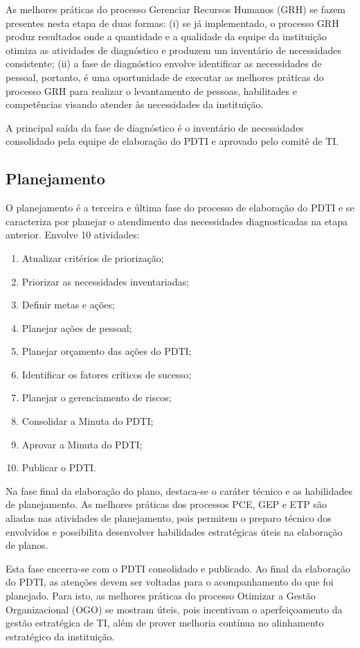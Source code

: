 As melhores práticas do processo Gerenciar Recursos Humanos (GRH) se fazem presentes nesta etapa de duas formas: (i) se já implementado, o processo GRH produz resultados onde a quantidade e a qualidade da equipe da instituição otimiza as atividades de diagnóstico e produzem um inventário de necessidades consistente; (ii) a fase de diagnóstico envolve identificar as necessidades de pessoal, portanto, é uma oportunidade de executar as melhores práticas do processo GRH para realizar o levantamento de pessoas, habilitades e competências visando atender às necessidades da instituição.

A principal saída da fase de diagnóstico é o inventário de necessidades consolidado pela equipe de elaboração do PDTI e aprovado pelo comitê de TI.


\subsection{Planejamento}

O planejamento é a terceira e última fase do processo de elaboração do PDTI e se caracteriza por planejar o atendimento das necessidades diagnosticadas na etapa anterior. Envolve 10 atividades:
\begin{enumerate}
\item Atualizar critérios de priorização;
\item Priorizar as necessidades inventariadas;
\item Definir metas e ações;
\item Planejar ações de pessoal;
\item Planejar orçamento das ações do PDTI;
\item Identificar os fatores críticos de sucesso;
\item Planejar o gerenciamento de riscos;
\item Consolidar a Minuta do PDTI;
\item Aprovar a Minuta do PDTI;
\item Publicar o PDTI.
\end{enumerate}

Na fase final da elaboração do plano, destaca-se o caráter técnico e as habilidades de planejamento. As melhores práticas dos processos PCE, GEP e ETP são aliadas nas atividades de planejamento, pois permitem o preparo técnico dos envolvidos e possibilita desenvolver habilidades estratégicas úteis na elaboração de planos.

Esta fase encerra-se com o PDTI consolidado e publicado. Ao final da elaboração do PDTI, as atenções devem ser voltadas para o acompanhamento do que foi planejado. Para isto, as melhores práticas do processo Otimizar a Gestão Organizacional (OGO) se mostram úteis, pois incentivam o aperfeiçoamento da gestão estratégica de TI, além de prover melhoria contínua no alinhamento estratégico da instituição.

